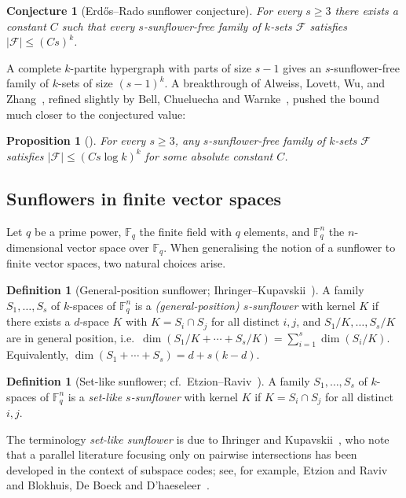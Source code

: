 \documentclass[11pt]{article}
\newtheorem{proposition}[theorem]{Proposition}
\newtheorem{conjecture}[theorem]{Conjecture}
\theoremstyle{definition}
\newtheorem{definition}[theorem]{Definition}
\newcommand{\F}{\mathbb{F}}
\begin{document}
\begin{conjecture}[Erd\H{o}s--Rado sunflower conjecture]
For every $s \geq 3$ there exists a constant $C$ such that every $s$-sunflower-free family of $k$-sets $\mathcal{F}$ satisfies $|\mathcal{F}| \leq (Cs)^k$.
\end{conjecture}

A complete $k$-partite hypergraph with parts of size $s-1$ gives an $s$-sunflower-free family of $k$-sets of size $(s-1)^k$. A breakthrough of Alweiss, Lovett, Wu, and Zhang~\cite{alwz}, refined slightly by Bell, Chueluecha and Warnke~\cite{bcw}, pushed the bound much closer to the conjectured value:

\begin{proposition}[\cite{alwz,bcw}]
For every $s \geq 3$, any $s$-sunflower-free family of $k$-sets $\mathcal{F}$ satisfies $|\mathcal{F}| \leq (Cs \log k)^k$ for some absolute constant $C$.
\end{proposition}

\subsection{Sunflowers in finite vector spaces}

Let $q$ be a prime power, $\F_q$ the finite field with $q$ elements, and $\F_q^n$ the $n$-dimensional vector space over $\F_q$. When generalising the notion of a sunflower to finite vector spaces, two natural choices arise.

\begin{definition}[General-position sunflower; Ihringer--Kupavskii~\cite{ik2026}]\label{def:gp-sunflower}
A family $S_1, \ldots, S_s$ of $k$-spaces of $\F_q^n$ is a \emph{(general-position) $s$-sunflower} with kernel $K$ if there exists a $d$-space $K$ with $K = S_i \cap S_j$ for all distinct $i, j$, and $S_1/K, \ldots, S_s/K$ are in general position, i.e.\
$\dim(S_1/K + \cdots + S_s/K) = \sum_{i=1}^s \dim(S_i/K)$.
Equivalently, $\dim(S_1 + \cdots + S_s) = d + s(k-d)$.
\end{definition}

\begin{definition}[Set-like sunflower; cf.~Etzion--Raviv~\cite{etzion-raviv}]\label{def:set-like-sunflower}
A family $S_1, \ldots, S_s$ of $k$-spaces of $\F_q^n$ is a \emph{set-like $s$-sunflower} with kernel $K$ if $K = S_i \cap S_j$ for all distinct $i, j$.
\end{definition}

The terminology \emph{set-like sunflower} is due to Ihringer and Kupavskii~\cite{ik2026}, who note that a parallel literature focusing only on pairwise intersections has been developed in the context of subspace codes; see, for example, Etzion and Raviv~\cite{etzion-raviv} and Blokhuis, De Boeck and D'haeseleer~\cite{bdh}.
\end{document}
